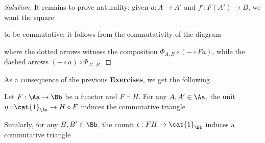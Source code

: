 \begin{exercise}
\begin{proof}[Solution]
    It remains to prove naturality:
    given $a:A \to A'$ and $f':F(A') \to B$, 
    we want the square
    \begin{center}
    \end{center}
    to be commutative; it follows from the commutativity 
    of the diagram
    \begin{center}
    \end{center}
    where the dotted arrows witness the composition 
    $\Phi_{A,B} \circ (-\circ Fa)$, 
    while the dashed arrows
    $(- \circ a) \circ \Phi_{A',B}$.
    \end{proof}
\end{exercise}

As a consequence of the previous \textbf{Exercises},
we get the following

\begin{lemma}\label{adj-triangle}
    Let $F:\Aa \to \Bb$ be a functor and $F \dashv H$.
    For any $A, A' \in \Aa$, the unit $\eta:\cat{1}_{\Aa} \to H \circ F$ 
    induces the commutative triangle
    \begin{center}
    \end{center}
    Similarly, for any $B,B' \in \Bb$,
    the counit $\epsilon: FH \to \cat{1}_{\Bb}$
    induces a commutative triangle
    \begin{center}
    \end{center}
\end{lemma}

